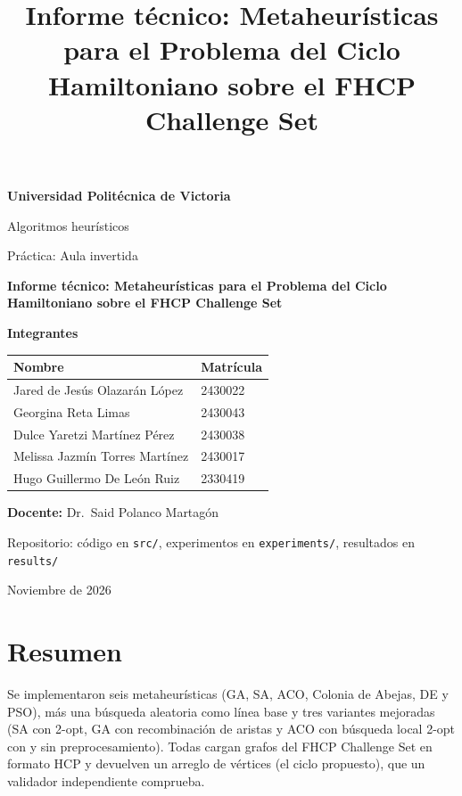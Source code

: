 \documentclass[
  spanish,
  11pt,
]{article}
\title{Informe técnico: Metaheurísticas para el Problema del Ciclo
Hamiltoniano sobre el FHCP Challenge Set}
\author{}
\date{}
\begin{document}
\begin{titlepage}
\centering
{\Large\bfseries Universidad Politécnica de Victoria\par}
\vspace{0.6cm}
{\large Algoritmos heurísticos\par}
{\large Práctica: Aula invertida\par}
\vspace{2.5cm}
{\LARGE\bfseries Informe técnico: Metaheurísticas para el Problema del Ciclo Hamiltoniano sobre el FHCP Challenge Set\par}
\vspace{2.5cm}
{\large\bfseries Integrantes\par}
\vspace{0.4cm}
\begin{tabular}{@{}ll@{}}
\toprule
Nombre & Matrícula \\
\midrule
Jared de Jesús Olazarán López & 2430022 \\
Georgina Reta Limas & 2430043 \\
Dulce Yaretzi Martínez Pérez & 2430038 \\
Melissa Jazmín Torres Martínez & 2430017 \\
Hugo Guillermo De León Ruiz & 2330419 \\
\bottomrule
\end{tabular}
\vspace{1.5cm}

{\large \textbf{Docente:} Dr.~Said Polanco Martagón\par}
\vfill
{\small Repositorio: código en \texttt{src/}, experimentos en \texttt{experiments/}, resultados en \texttt{results/}\par}
\vspace{0.3cm}
{\large Noviembre de 2026\par}
\end{titlepage}

\renewcommand*\contentsname{Índice}
{
\setcounter{tocdepth}{3}
\tableofcontents
}
\clearpage

\section{Resumen}\label{resumen}

Se implementaron seis metaheurísticas (GA, SA, ACO, Colonia de Abejas,
DE y PSO), más una búsqueda aleatoria como línea base y tres variantes
mejoradas (SA con 2-opt, GA con recombinación de aristas y ACO con
búsqueda local 2-opt con y sin preprocesamiento). Todas cargan grafos
del FHCP Challenge Set en formato HCP y devuelven un arreglo de vértices
(el ciclo propuesto), que un validador independiente comprueba.
\end{document}
